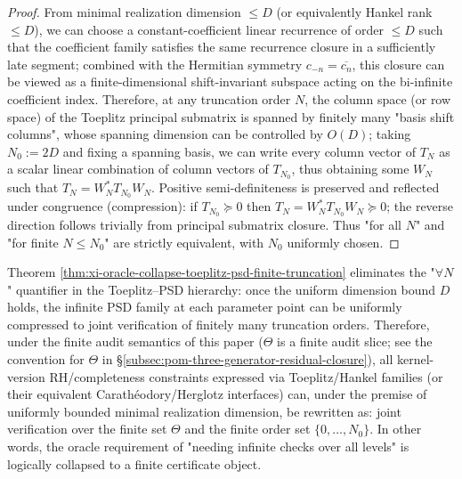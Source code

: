 \begin{proof}
From minimal realization dimension \(\le D\) (or equivalently Hankel rank \(\le D\)), we can choose a constant-coefficient linear recurrence of order \(\le D\) such that the coefficient family satisfies the same recurrence closure in a sufficiently late segment; combined with the Hermitian symmetry \(c_{-n}=\overline{c_n}\), this closure can be viewed as a finite-dimensional shift-invariant subspace acting on the bi-infinite coefficient index.
Therefore, at any truncation order \(N\), the column space (or row space) of the Toeplitz principal submatrix is spanned by finitely many "basis shift columns", whose spanning dimension can be controlled by \(O(D)\); taking \(N_0:=2D\) and fixing a spanning basis, we can write every column vector of \(T_N\) as a scalar linear combination of column vectors of \(T_{N_0}\), thus obtaining some \(W_N\) such that \(T_N=W_N^\ast T_{N_0}W_N\).
Positive semi-definiteness is preserved and reflected under congruence (compression): if \(T_{N_0}\succeq 0\) then \(T_N=W_N^\ast T_{N_0}W_N\succeq 0\); the reverse direction follows trivially from principal submatrix closure.
Thus "for all \(N\)" and "for finite \(N\le N_0\)" are strictly equivalent, with \(N_0\) uniformly chosen.
\end{proof}

\begin{remark}\label{rem:xi-oracle-collapse-finite-certification}
Theorem \ref{thm:xi-oracle-collapse-toeplitz-psd-finite-truncation} eliminates the "\(\forall N\)" quantifier in the Toeplitz--PSD hierarchy: once the uniform dimension bound \(D\) holds, the infinite PSD family at each parameter point can be uniformly compressed to joint verification of finitely many truncation orders.
Therefore, under the finite audit semantics of this paper (\(\Theta\) is a finite audit slice; see the convention for \(\Theta\) in \S\ref{subsec:pom-three-generator-residual-closure}), all kernel-version RH/completeness constraints expressed via Toeplitz/Hankel families (or their equivalent Carath\'eodory/Herglotz interfaces) can, under the premise of uniformly bounded minimal realization dimension, be rewritten as: joint verification over the finite set \(\Theta\) and the finite order set \(\{0,\dots,N_0\}\). In other words, the oracle requirement of "needing infinite checks over all levels" is logically collapsed to a finite certificate object.
\end{remark}

